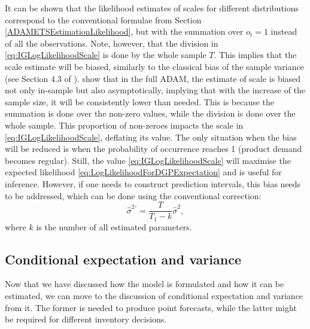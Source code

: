 \documentclass[
]{book}
\theoremstyle{definition}
\theoremstyle{definition}
\theoremstyle{definition}
\theoremstyle{definition}
\theoremstyle{remark}
\begin{document}
It can be shown that the likelihood estimates of scales for different distributions correspond to the conventional formulae from Section \ref{ADAMETSEstimationLikelihood}, but with the summation over \(o_t=1\) instead of all the observations. Note, however, that the division in \eqref{eq:IGLogLikelihoodScale} is done by the whole sample \(T\). This implies that the scale estimate will be biased, similarly to the classical bias of the sample variance (see Section 4.3 of \citet{SvetunkovSBA}). \citet{Svetunkov2019a} show that in the full ADAM, the estimate of scale is biased not only in-sample but also asymptotically, implying that with the increase of the sample size, it will be consistently lower than needed. This is because the summation is done over the non-zero values, while the division is done over the whole sample. This proportion of non-zeroes impacts the scale in \eqref{eq:IGLogLikelihoodScale}, deflating its value. The only situation when the bias will be reduced is when the probability of occurrence reaches 1 (product demand becomes regular). Still, the value \eqref{eq:IGLogLikelihoodScale} will maximise the expected likelihood \eqref{eq:LogLikelihoodForDGPExpectation} and is useful for inference. However, if one needs to construct prediction intervals, this bias needs to be addressed, which can be done using the conventional correction:
\begin{equation}
\hat{\sigma}^2{^{\prime}} = \frac{T}{T_1-k} \hat{\sigma}^2,
\label{eq:scaleFixed}
\end{equation}
where \(k\) is the number of all estimated parameters.

\hypertarget{conditional-expectation-and-variance}{%
\subsection{Conditional expectation and variance}\label{conditional-expectation-and-variance}}

Now that we have discussed how the model is formulated and how it can be estimated, we can move to the discussion of conditional expectation and variance from it. The former is needed to produce point forecasts, while the latter might be required for different inventory decisions.
\end{document}
